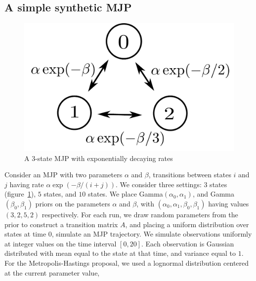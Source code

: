 \subsection{A simple synthetic MJP}
\begin{figure}
    \vspace{-.3in}
  \begin{minipage}[!hp]{.05\linewidth}
    \hspace{.1in}
  \end{minipage}
  \begin{minipage}[!hp]{.9\linewidth}
  \centering
    \includegraphics [width=\textwidth, angle=0]{figs/exp_model.pdf}
    \caption{A 3-state MJP with exponentially decaying rates}
    \label{fig:exp_model}
      \end{minipage}
  \end{figure}
Consider an MJP with two parameters $\alpha$ and $\beta$, 
transitions between states $i$ and $j$ having rate $\alpha \exp(-\beta/(i+j))$.
We consider three settings: $3$ states (figure~\ref{fig:exp_model}),
$5$ states, and $10$ states.
We place Gamma$(\alpha_0,\alpha_1)$, and Gamma$(\beta_0, \beta_1)$ priors on 
the parameters $\alpha$ and $\beta$, with $(\alpha_0,\alpha_1,\beta_0,\beta_1)$ 
having values $(3,2,5,2)$ respectively. For each run, we draw random parameters 
from the prior to construct a transition matrix $A$, and placing a uniform 
distribution over states at time $0$, simulate an MJP trajectory.
We simulate observations uniformly at integer values on the time interval 
$[0, 20]$. Each observation is Gaussian distributed with mean equal to the state
at that time, and variance equal to $1$.  For the Metropolis-Hastings proposal, 
we used a lognormal distribution centered at the current parameter value, 
